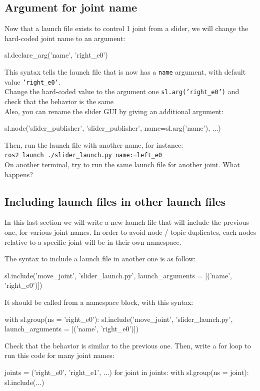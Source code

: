 \documentclass{ecnreport}
\begin{document}
\subsection{Argument for joint name}

Now that a launch file exists to control 1 joint from a slider, we will change the hard-coded joint name to an argument:
\begin{pythoncodelarge}
sl.declare_arg('name', 'right_e0')
\end{pythoncodelarge}
This syntax tells the launch file that is now has a \texttt{name} argument, with default value \texttt{'right\_e0'}.\\

Change the hard-coded value to the argument one \texttt{sl.arg('right\_e0')} and check that the behavior is the same\\

Also, you can rename the slider GUI by giving an additional argument:
\begin{pythoncodelarge}
sl.node('slider_publisher', 'slider_publisher', name=sl.arg('name'), ...)
\end{pythoncodelarge}

Then, run the launch file with another name, for instance:\\ \texttt{ros2 launch ./slider\_launch.py name:=left\_e0}\\
On another terminal, try to run the same launch file for another joint. What happens?\\



\subsection{Including launch files in other launch files}

In this last section we will write a new launch file that will include the previous one, for various joint names. In order to avoid node / topic duplicates, each nodes relative to a specific joint will be in their own namespace. 

The syntax to include a launch file in another one is as follow:
\begin{pythoncodelarge}
sl.include('move_joint', 'slider_launch.py', launch_arguments = [('name', 'right_e0')])
\end{pythoncodelarge}

It should be called from a namespace block, with this syntax:
\begin{pythoncodelarge}
with sl.group(ns = 'right_e0'):
  sl.include('move_joint', 'slider_launch.py', launch_arguments = [('name', 'right_e0')])
\end{pythoncodelarge}

Check that the behavior is similar to the previous one. Then, write a for loop to run this code for many joint names:
\begin{pythoncodelarge}
joints = ('right_e0', 'right_e1', ...)
for joint in joints:
    with sl.group(ns = joint):
        sl.include(...)
\end{pythoncodelarge}
\end{document}
